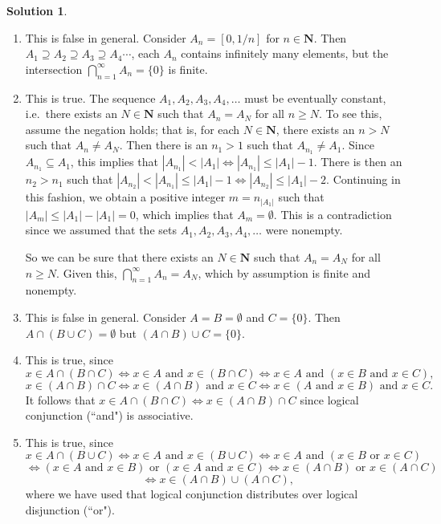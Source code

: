 \documentclass[12pt]{article}
\theoremstyle{definition}
\theoremstyle{exercise}
\theoremstyle{solution}
\newtheorem*{solution}{Solution}
\begin{document}
\begin{solution}
    \begin{enumerate}[label = (\alph*)]
        \item This is false in general. Consider \( A_n = [0, 1/n] \) for \( n \in \mathbf{N} \). Then \( A_1 \supseteq A_2 \supseteq A_3 \supseteq A_4 \cdots \), each \( A_n \) contains infinitely many elements, but the intersection \( \bigcap_{n=1}^{\infty} A_n = \{ 0 \} \) is finite.

        \item This is true. The sequence \( A_1, A_2, A_3, A_4, \ldots \) must be eventually constant, i.e.\ there exists an \( N \in \mathbf{N} \) such that \( A_n = A_N \) for all \( n \geq N \). To see this, assume the negation holds; that is, for each \( N \in \mathbf{N} \), there exists an \( n > N \) such that \( A_n \neq A_N \). Then there is an \( n_1 > 1 \) such that \( A_{n_1} \neq A_1 \). Since \( A_{n_1} \subseteq A_1 \), this implies that \( |A_{n_1}| < |A_1| \iff |A_{n_1}| \leq |A_1| - 1 \). There is then an \( n_2 > n_1 \) such that \( |A_{n_2}| < |A_{n_1}| \leq |A_1| - 1 \iff |A_{n_2}| \leq |A_1| - 2 \). Continuing in this fashion, we obtain a positive integer \( m = n_{|A_1|} \) such that \( |A_m| \leq |A_1| - |A_1| = 0 \), which implies that \( A_m = \emptyset \). This is a contradiction since we assumed that the sets \( A_1, A_2, A_3, A_4, \ldots \) were nonempty.

        So we can be sure that there exists an \( N \in \mathbf{N} \) such that \( A_n = A_N \) for all \( n \geq N \). Given this, \( \bigcap_{n=1}^{\infty} A_n = A_N \), which by assumption is finite and nonempty.

        \item This is false in general. Consider \( A = B = \emptyset \) and \( C = \{ 0 \} \). Then \( A \cap (B \cup C) = \emptyset \) but \( (A \cap B) \cup C = \{ 0 \} \).

        \item This is true, since
        \[
            x \in A \cap (B \cap C) \iff x \in A \text{ and } x \in (B \cap C) \iff x \in A \text{ and } (x \in B \text{ and } x \in C),
        \]
        \[
            x \in (A \cap B) \cap C \iff x \in (A \cap B) \text{ and } x \in C \iff x \in (A \text{ and } x \in B) \text{ and } x \in C.
        \]
        It follows that \( x \in A \cap (B \cap C) \iff x \in (A \cap B) \cap C \) since logical conjunction (``and") is associative.

        \item This is true, since
        \[
            x \in A \cap (B \cup C) \iff x \in A \text{ and } x \in (B \cup C) \iff x \in A \text{ and } (x \in B \text{ or } x \in C)
        \]
        \[
            \iff (x \in A \text{ and } x \in B) \text{ or } (x \in A \text{ and } x \in C) \iff x \in (A \cap B) \text{ or } x \in (A \cap C)
        \]
        \[
            \iff x \in (A \cap B) \cup (A \cap C),
        \]
        where we have used that logical conjunction distributes over logical disjunction (``or").
    \end{enumerate}
\end{solution}
\end{document}
